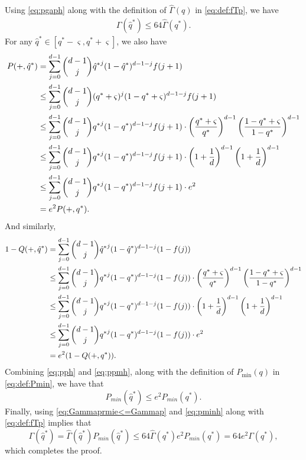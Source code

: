 \documentclass[onecolumn,letterpaper]{IEEEtran}
\newcommand{\cp}{{q}}
\newcommand{\pmin}{{P_{\min}(\cp)}}
\newcommand{\cpn}{{\cp^*}}
\newcommand{\ftau}{{\Gamma}}
\newcommand{\ftaup}{{\hat{\Gamma}}}
\newcommand{\fTp}{\ftaup (\cp)}
\newcommand{\fTn}{\ftau (\cpn)}
\newcommand{\fTpn}{\ftaup (\cpn)}
\newcommand{\cph}{{\hat{\cp}^*}}
\newcommand{\pph}{{P(+,\cph)}}
\newcommand{\ppmh}{{Q(+,\cph)}}
\newcommand{\ppn}{{P(+,\cpn)}}
\newcommand{\ppmn}{{Q(+,\cpn)}}
\newcommand{\pminh}{{P_{min}(\cph)}}
\newcommand{\fTh}{{\Gamma(\cph)}}
\begin{document}
Using \eqref{eq:pgaph} along with the definition of $\fTp$ in \eqref{eq:def:fTp}, we have
\begin{align}
\label{eq:Gammaprmie<=Gammap}
    \ftaup(\cph)\leq 64 \fTpn.
\end{align}
For any $\cph \in \left[ \cpn-\varsigma , \cpn+\varsigma \right]$, we also have 
\begin{align}
    \pph &= \sum\limits_{j=0}^{d-1} \binom{d-1}{j} \cph^j (1-\cph)^{d-1-j} f(j+1) \notag\\ 
        &\leq  \sum\limits_{j=0}^{d-1} \binom{d-1}{j} (\cpn+\varsigma)^j (1-\cpn+\varsigma)^{d-1-j} f(j+1) \notag\\ 
        &\le \sum\limits_{j=0}^{d-1} \binom{d-1}{j} \cpn^j (1-\cpn)^{d-1-j} f(j+1) \cdot \left( \frac{\cpn+\varsigma}{\cpn} \right)^{d-1} \left( \frac{1-\cpn+\varsigma}{1-\cpn} \right)^{d-1} \notag\\ 
        &\le \sum\limits_{j=0}^{d-1} \binom{d-1}{j} \cpn^j (1-\cpn)^{d-1-j} f(j+1) \cdot \left( 1+\frac{1}{d} \right)^{d-1} \left( 1+\frac{1}{d} \right)^{d-1} \notag\\ 
        &\le \sum\limits_{j=0}^{d-1} \binom{d-1}{j} \cpn^j (1-\cpn)^{d-1-j} f(j+1) \cdot e^2 \notag \\ 
        &= e^2 \ppn. \label{eq:pph}
\end{align}
And similarly,
\begin{align}
    1 - \ppmh &= \sum\limits_{j=0}^{d-1} \binom{d-1}{j} \cph^j (1-\cph)^{d-1-j} (1-f(j)) \notag\\ 
    &\le \sum\limits_{j=0}^{d-1} \binom{d-1}{j} \cpn^j (1-\cpn)^{d-1-j} (1-f(j)) \cdot \left( \frac{\cpn+\varsigma}{\cpn} \right)^{d-1} \left( \frac{1-\cpn+\varsigma}{1-\cpn} \right)^{d-1} \notag\\ 
    &\le \sum\limits_{j=0}^{d-1} \binom{d-1}{j} \cpn^j (1-\cpn)^{d-1-j} (1-f(j)) \cdot \left( 1+\frac{1}{d} \right)^{d-1} \left( 1+\frac{1}{d} \right)^{d-1} \notag\\ 
    &\le \sum\limits_{j=0}^{d-1} \binom{d-1}{j} \cpn^j (1-\cpn)^{d-1-j} (1-f(j)) \cdot e^2 \notag\\ 
    &= e^2 (1-\ppmn). \label{eq:ppmh}
\end{align}
Combining \eqref{eq:pph} and \eqref{eq:ppmh}, along with the definition of $\pmin$ in \eqref{eq:def:Pmin}, we have that 
\begin{equation} \label{eq:pminh}
    \pminh \le e^2 P_{min}(\cpn).
\end{equation}
Finally, using \eqref{eq:Gammaprmie<=Gammap} and \eqref{eq:pminh} along with \eqref{eq:def:fTp} implies that 
\begin{equation*}
    \fTh=\ftaup(\cph) \pminh  \le 64 \fTpn e^2 P_{min}(\cpn)=64e^2\fTn,
\end{equation*}
which completes the proof.
\end{document}
